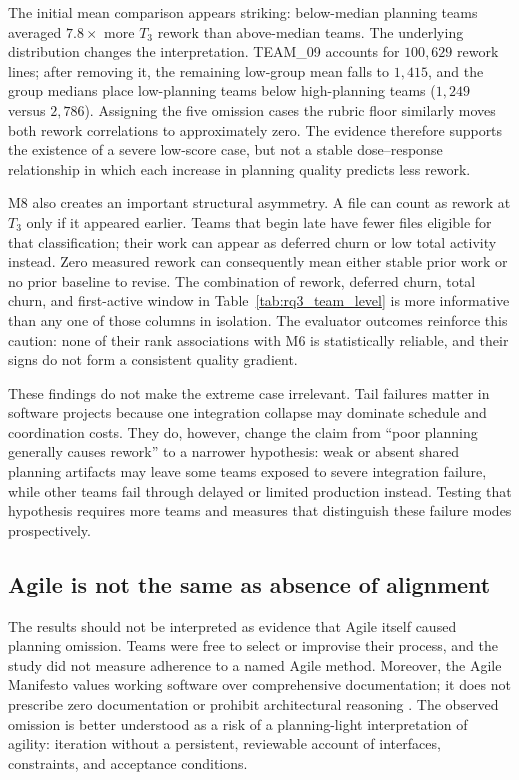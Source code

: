 \documentclass[conference]{IEEEtran}
\begin{document}
The initial mean comparison appears striking: below-median planning teams
averaged $7.8\times$ more $T_3$ rework than above-median teams. The underlying
distribution changes the interpretation. TEAM\_09 accounts for $100{,}629$
rework lines; after removing it, the remaining low-group mean falls to
$1{,}415$, and the group medians place low-planning teams below high-planning
teams ($1{,}249$ versus $2{,}786$). Assigning the five omission cases the
rubric floor similarly moves both rework correlations to approximately zero.
The evidence therefore supports the existence of a severe low-score case, but
not a stable dose--response relationship in which each increase in planning
quality predicts less rework.

M8 also creates an important structural asymmetry. A file can count as rework
at $T_3$ only if it appeared earlier. Teams that begin late have fewer files
eligible for that classification; their work can appear as deferred churn or
low total activity instead. Zero measured rework can consequently mean either
stable prior work or no prior baseline to revise. The combination of rework,
deferred churn, total churn, and first-active window in
Table~\ref{tab:rq3_team_level} is more informative than any one of those
columns in isolation. The evaluator outcomes reinforce this caution: none of
their rank associations with M6 is statistically reliable, and their signs do
not form a consistent quality gradient.

These findings do not make the extreme case irrelevant. Tail failures matter
in software projects because one integration collapse may dominate schedule
and coordination costs. They do, however, change the claim from ``poor
planning generally causes rework'' to a narrower hypothesis: weak or absent
shared planning artifacts may leave some teams exposed to severe integration
failure, while other teams fail through delayed or limited production instead.
Testing that hypothesis requires more teams and measures that distinguish
these failure modes prospectively.

\subsection{Agile is not the same as absence of alignment}

The results should not be interpreted as evidence that Agile itself caused
planning omission. Teams were free to select or improvise their process, and
the study did not measure adherence to a named Agile method. Moreover, the
Agile Manifesto values working software over comprehensive documentation; it
does not prescribe zero documentation or prohibit architectural reasoning
\cite{agile_manifesto_2001}. The observed omission is better understood as a
risk of a planning-light interpretation of agility: iteration without a
persistent, reviewable account of interfaces, constraints, and acceptance
conditions.
\end{document}
